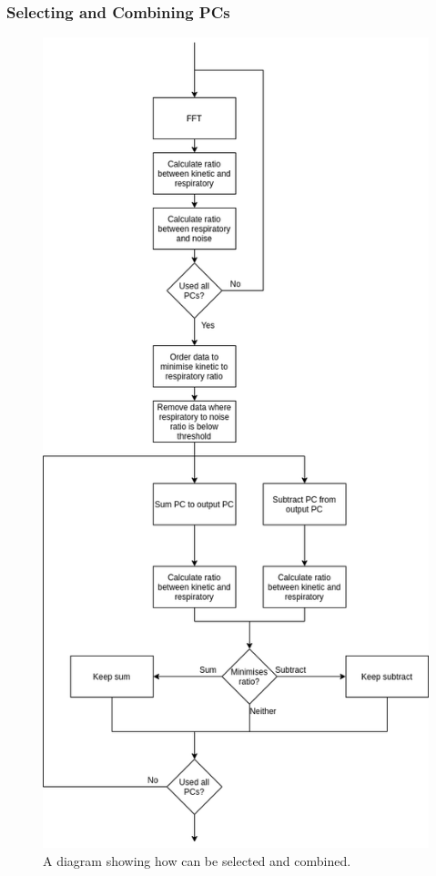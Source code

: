                 \subsubsection{Selecting and Combining PCs} \label{sec:pca_data_driven_surrogate_signal_extraction_methods_for_dynamic_pet_methods_selecting_and_combining_pcs}
                    \begin{figure}
                        \centering
                        
                        \includegraphics[width=0.7\linewidth]{figures/pca_data_driven_surrogate_signal_extraction_methods_for_dynamic_pet_methods_data_driven_surrogate_signal_extraction_select_combine.png}
                        
                        \captionsetup{singlelinecheck=false, justification=centering}
                        \caption{A diagram showing how  can be selected and combined.}
                        \label{fig:pca_data_driven_surrogate_signal_extraction_methods_for_dynamic_pet_methods_data_driven_surrogate_signal_extraction_select_combine}
                    \end{figure}
                
